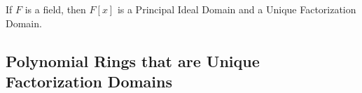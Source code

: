 \documentclass[../main]{subfiles}
\begin{document}
\begin{cor}
 If $F$ is a field, then $F[x]$ is a Principal Ideal Domain and a Unique Factorization Domain.
\end{cor}


\subsection{Polynomial Rings that are Unique Factorization Domains}





 
 
 
 
 
 
 
 
 
 
 
 
 
 
 
 
 
 
 
\end{document}
